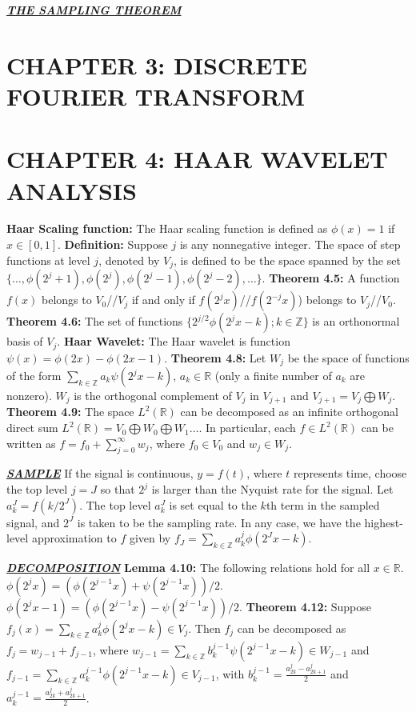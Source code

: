 \documentclass[a4paper]{article}
\newcommand{\R}{\mathbb{R}}
\newcommand{\Z}{\mathbb{Z}}
\begin{document}
\begin{multicols}{2}
\underline{\textsl{\bf THE SAMPLING THEOREM}}



\section*{CHAPTER 3: DISCRETE FOURIER TRANSFORM}




\section*{CHAPTER 4: HAAR WAVELET ANALYSIS}
{\bf Haar Scaling function:} The Haar scaling function is defined as $\phi(x) = 1$ if $x\in[0,1]$.
{\bf Definition:} Suppose $j$ is any nonnegative integer. The space of step functions at level $j$, denoted by $V_j$, is defined to be the space spanned by the set $\{\dots,\phi(2^j+1),\phi(2^j),\phi(2^j-1),\phi(2^j-2),\dots\}$.
{\bf Theorem 4.5:} A function $f(x)$ belongs to $V_0$//$V_j$ if and only if $f(2^jx)$//$f(2^{-j}x)$) belongs to $V_j$//$V_0$.
{\bf Theorem 4.6:} The set of functions $\{2^{j/2}\phi(2^jx-k);k\in\Z\}$ is an orthonormal basis of $V_j$.
{\bf Haar Wavelet:} The Haar wavelet is function $\psi(x) = \phi(2x)-\phi(2x-1)$.
{\bf Theorem 4.8:} Let $W_j$ be the space of functions of the form $\sum_{k\in\Z}a_k\psi(2^jx-k)$, $a_k\in\R$ (only a finite number of $a_k$ are nonzero). $W_j$ is the orthogonal complement of $V_j$ in $V_{j+1}$ and $V_{j+1}=V_j\bigoplus W_j$.
{\bf Theorem 4.9:} The space $L^2(\R)$ can be decomposed as an infinite orthogonal direct sum $L^2(\R)=V_0\bigoplus W_0\bigoplus W_1\dots$. In particular, each $f\in L^2(\R)$ can be written as $f=f_0+\sum_{j=0}^{\infty}w_j$, where $f_0\in V_0$ and $w_j\in W_j$.

\underline{\textsl{\bf SAMPLE}}
If the signal is continuous, $y=f(t)$, where $t$ represents time, choose the top level $j=J$ so that $2^j$ is larger than the Nyquist rate for the signal. Let $a_k^J=f(k/2^J)$. The top level $a_k^J$ is set equal to the $k$th term in the sampled signal, and $2^J$ is taken to be the sampling rate. In any case, we have the highest-level approximation to $f$ given by $f_J=\sum_{k\in\Z}a_k^j\phi(2^Jx-k)$.

\underline{\textsl{\bf DECOMPOSITION}}
{\bf Lemma 4.10:} The following relations hold for all $x\in\R$. $\phi(2^jx)=\left(\phi(2^{j-1}x)+\psi(2^{j-1}x)\right)/2$. $\phi(2^jx-1)=\left(\phi(2^{j-1}x)-\psi(2^{j-1}x)\right)/2$.
{\bf Theorem 4.12:} Suppose $f_j(x)=\sum_{k\in\Z}a_k^j\phi(2^jx-k)\in V_j$. Then $f_j$ can be decomposed as $f_j=w_{j-1}+f_{j-1}$, where $w_{j-1}=\sum_{k\in\Z}b_k^{j-1}\psi(2^{j-1}x-k)\in W_{j-1}$ and $f_{j-1}=\sum_{k\in\Z}a_k^{j-1}\phi(2^{j-1}x-k)\in V_{j-1}$, with $b_k^{j-1}=\frac{a_{2k}^j-a_{2k+1}^j}{2}$ and $a_k^{j-1}=\frac{a_{2k}^j+a_{2k+1}^j}{2}$.


\end{multicols}
\end{document}
